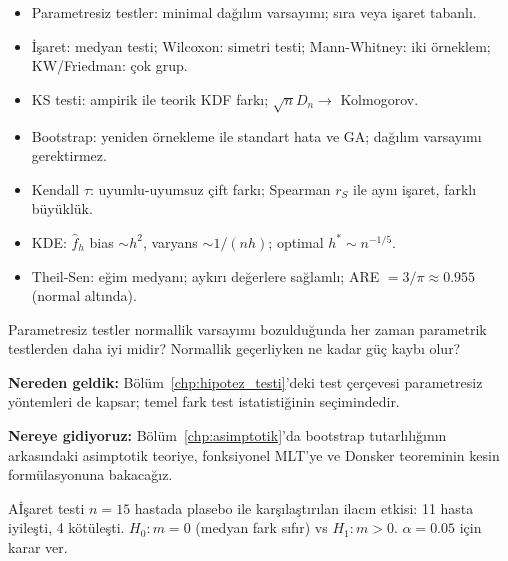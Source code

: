 
\begin{mikroozet}
\begin{itemize}
  \item Parametresiz testler: minimal dağılım varsayımı; sıra veya işaret tabanlı.
  \item İşaret: medyan testi; Wilcoxon: simetri testi; Mann-Whitney: iki örneklem; KW/Friedman: çok grup.
  \item KS testi: ampirik ile teorik KDF farkı; $\sqrt{n}D_n\to$ Kolmogorov.
  \item Bootstrap: yeniden örnekleme ile standart hata ve GA; dağılım varsayımı gerektirmez.
  \item Kendall $\tau$: uyumlu-uyumsuz çift farkı; Spearman $r_S$ ile aynı işaret, farklı büyüklük.
  \item KDE: $\hat{f}_h$ bias $\sim h^2$, varyans $\sim 1/(nh)$; optimal $h^*\sim n^{-1/5}$.
  \item Theil-Sen: eğim medyanı; aykırı değerlere sağlamlı; ARE $=3/\pi\approx0.955$ (normal altında).
\end{itemize}
\end{mikroozet}

\begin{ozyansima}
Parametresiz testler normallik varsayımı bozulduğunda her zaman parametrik testlerden daha iyi midir? Normallik geçerliyken ne kadar güç kaybı olur?
\end{ozyansima}

\begin{kopru}
\textbf{Nereden geldik:} Bölüm~\ref{chp:hipotez_testi}'deki test çerçevesi parametresiz yöntemleri de kapsar; temel fark test istatistiğinin seçimindedir.

\textbf{Nereye gidiyoruz:} Bölüm~\ref{chp:asimptotik}'da bootstrap tutarlılığının arkasındaki asimptotik teoriye, fonksiyonel MLT'ye ve Donsker teoreminin kesin formülasyonuna bakacağız.
\end{kopru}


\cozumlualistirmalar

\begin{alistirma}[Al.17.1]{A}{İşaret testi}
$n=15$ hastada plasebo ile karşılaştırılan ilacın etkisi: 11 hasta iyileşti, 4 kötüleşti. $H_0:m=0$ (medyan fark sıfır) vs $H_1:m>0$. $\alpha=0.05$ için karar ver.
\end{alistirma}

